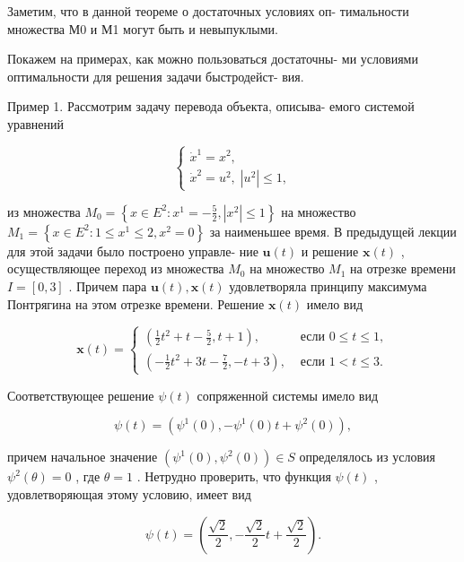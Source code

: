 \documentclass[8pt]{extarticle}
\begin{document}
Заметим, что в данной теореме о достаточных условиях оп- тимальности множества М0 и М1 могут быть и невыпуклыми.

Покажем на примерах, как можно пользоваться достаточны- ми условиями оптимальности для решения задачи быстродейст- вия.

Пример 1. Рассмотрим задачу перевода объекта, описыва- емого системой уравнений

\[
\left\{  \begin{array}{l} {\dot{x}}^{1} = {x}^{2}, \\  {\dot{x}}^{2} = {u}^{2},\;\left| {u}^{2}\right|  \leq  1, \end{array}\right.
\]

из множества \({M}_{0} = \left\{  {x \in  {E}^{2} : {x}^{1} =  - \frac{5}{2},\left| {x}^{2}\right|  \leq  1}\right\}\) на множество \({M}_{1} = \left\{  {x \in  {E}^{2} : 1 \leq  {x}^{1} \leq  2,{x}^{2} = 0}\right\}\) за наименьшее время. В предыдущей лекции для этой задачи было построено управле- ние \(\mathbf{u}\left( t\right)\) и решение \(\mathbf{x}\left( t\right)\) , осуществляющее переход из множества \({M}_{0}\) на множество \({M}_{1}\) на отрезке времени \(I = \left[ 0,3 \right]\) . Причем пара \(\mathbf{u}\left( t\right) ,\mathbf{x}\left( t\right)\) удовлетворяла принципу максимума Понтрягина на этом отрезке времени. Решение \(\mathbf{x}\left( t\right)\) имело вид

\[
\mathbf{x}\left( t\right)  = \left\{  \begin{array}{ll} \left( {\frac{1}{2}{t}^{2} + t - \frac{5}{2},t + 1}\right) , & \text{ если }0 \leq  t \leq  1, \\  \left( {-\frac{1}{2}{t}^{2} + {3t} - \frac{7}{2}, - t + 3}\right) , & \text{ если }1 < t \leq  3. \end{array}\right.
\]

Соответствующее решение \(\psi \left( t\right)\) сопряженной системы имело вид

\[
\psi \left( t\right)  = \left( {{\psi }^{1}\left( 0\right) , - {\psi }^{1}\left( 0\right) t + {\psi }^{2}\left( 0\right) }\right) ,
\]

причем начальное значение \(\left( {{\psi }^{1}\left( 0\right) ,{\psi }^{2}\left( 0\right) }\right)  \in  S\) определялось из условия \({\psi }^{2}\left( \theta \right)  = 0\) , где \(\theta  = 1\) . Нетрудно проверить, что функция \(\psi \left( t\right)\) , удовлетворяющая этому условию, имеет вид

\[
\psi \left( t\right)  = \left( {\frac{\sqrt{2}}{2}, - \frac{\sqrt{2}}{2}t + \frac{\sqrt{2}}{2}}\right) .
\]
\end{document}
